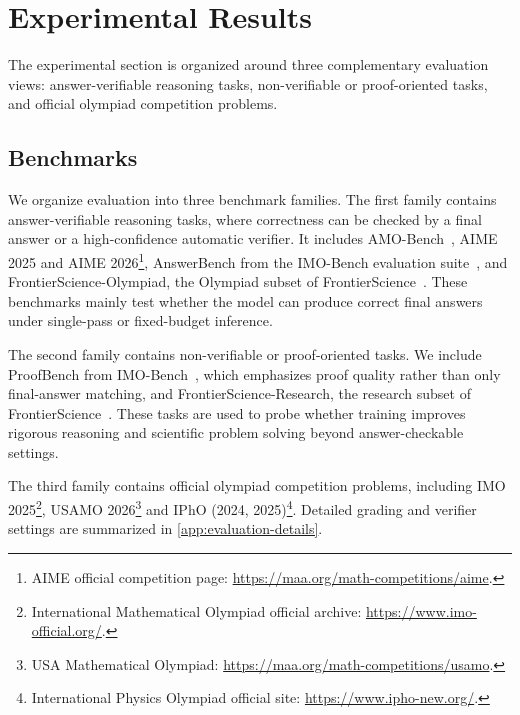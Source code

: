 \documentclass{llmxive}
\begin{document}
\section{Experimental Results}
\label{sec:exp-results}
The experimental section is organized around three complementary evaluation
views: answer-verifiable reasoning tasks, non-verifiable or proof-oriented
tasks, and official olympiad competition problems. 

\subsection{Benchmarks}

We organize evaluation into three benchmark families. The first family contains
answer-verifiable reasoning tasks, where correctness can be checked by a final
answer or a high-confidence automatic verifier. It includes AMO-Bench~\citep{an2025amobench},
AIME 2025 and AIME 2026\footnote{AIME official competition page:
\url{https://maa.org/math-competitions/aime}.}, AnswerBench from the
IMO-Bench evaluation suite~\citep{luong2025imobench}, and FrontierScience-Olympiad,
the Olympiad subset of FrontierScience~\citep{wang2026frontierscience}. These
benchmarks mainly test whether the model can produce correct final answers
under single-pass or fixed-budget inference.

The second family contains non-verifiable or proof-oriented tasks. We include
ProofBench from IMO-Bench~\citep{luong2025imobench}, which emphasizes proof
quality rather than only final-answer matching, and FrontierScience-Research, the
research subset of FrontierScience~\citep{wang2026frontierscience}. These tasks
are used to probe whether training improves rigorous reasoning and scientific
problem solving beyond answer-checkable settings.

The third family contains official olympiad competition problems, including
IMO 2025\footnote{International Mathematical Olympiad official archive:
\url{https://www.imo-official.org/}.}, USAMO 2026\footnote{USA
Mathematical Olympiad:
\url{https://maa.org/math-competitions/usamo}.} and IPhO (2024, 2025)\footnote{International Physics
Olympiad official site: \url{https://www.ipho-new.org/}.}. 
Detailed grading and verifier settings are summarized
in \cref{app:evaluation-details}.
\end{document}
